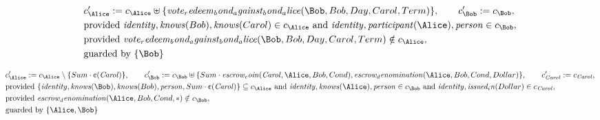 \begin{align*}
&
c'_
{
\Alice
}
 := 
c_
{
\Alice
}
 \uplus 
\{
\mathit{
vote_redeem_bond_against_bond_alice
}
(
\Bob
,
Bob
,
Day
,
Carol
,
Term
)
\}
, \qquad 
c'_
{
\Bob
}
 := 
c_
{
\Bob
}
,\\
&
\text{provided } 
\mathit{
identity
}
,
\mathit{
knows
}
(
Bob
)
,
\mathit{
knows
}
(
Carol
)
 \in c_
{
\Alice
}
 \text{ and } 
\mathit{
identity
}
,
\mathit{
participant
}
(
\Alice
)
,
\mathit{
person
}
 \in c_
{
\Bob
}
,\\
&
\text{provided } 
\mathit{
vote_redeem_bond_against_bond_alice
}
(
\Bob
,
Bob
,
Day
,
Carol
,
Term
)
 \notin c_
{
\Alice
}
,\\
&
\text{guarded by } \{
\Bob
\}
\end{align*}

\begin{align*}
&
c'_
{
\Alice
}
 := 
c_
{
\Alice
}
 \setminus 
\{
Sum
\cdot
\text{\textcent}
(
\mathit{Carol}
)
\}
, \qquad 
c'_
{
\Bob
}
 := 
c_
{
\Bob
}
 \uplus 
\{
Sum
\cdot
\mathit{
escrow_coin
}
(
\mathit{Carol}
,
\Alice
,
Bob
,
Cond
)
,
\mathit{
escrow_denomination
}
(
\Alice
,
Bob
,
Cond
,
Dollar
)
\}
, \qquad 
c'_
{
\mathit{Carol}
}
 := 
c_
{
\mathit{Carol}
}
,\\
&
\text{provided } 
\{
\mathit{
identity
}
,
\mathit{
knows
}
(
\Bob
)
,
\mathit{
knows
}
(
Bob
)
,
\mathit{
person
}
,
Sum
\cdot
\text{\textcent}
(
\mathit{Carol}
)
\}
 \subseteq c_
{
\Alice
}
 \text{ and } 
\mathit{
identity
}
,
\mathit{
knows
}
(
\Alice
)
,
\mathit{
person
}
 \in c_
{
\Bob
}
 \text{ and } 
\mathit{
identity
}
,
\mathit{
issued_in
}
(
Dollar
)
 \in c_
{
\mathit{Carol}
}
,\\
&
\text{provided } 
\mathit{
escrow_denomination
}
(
\Alice
,
Bob
,
Cond
,
\ast
)
 \notin c_
{
\Bob
}
,\\
&
\text{guarded by } \{
\Alice
,
\Bob
\}
\end{align*}

